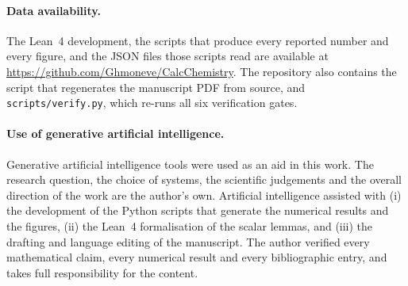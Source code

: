 \documentclass[11pt,a4paper]{article}
\theoremstyle{plain}
\theoremstyle{definition}
\theoremstyle{remark}
\begin{document}
\paragraph{Data availability.}
The Lean~4 development, the scripts that produce every reported number and every
figure, and the JSON files those scripts read are available at
\url{https://github.com/Ghmoneve/CalcChemistry}. The repository also contains the
script that regenerates the manuscript PDF from source, and
\texttt{scripts/verify.py}, which re-runs all six verification gates.

\paragraph{Use of generative artificial intelligence.}
Generative artificial intelligence tools were used as an aid in this work. The
research question, the choice of systems, the scientific judgements and the
overall direction of the work are the author's own. Artificial intelligence
assisted with (i) the development of the Python scripts that generate the
numerical results and the figures, (ii) the Lean~4 formalisation of the scalar
lemmas, and (iii) the drafting and language editing of the manuscript. The
author verified every mathematical claim, every numerical result and every
bibliographic entry, and takes full responsibility for the content.
\end{document}

